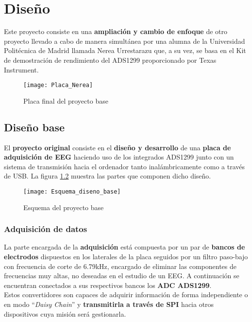 \chapter{Diseño\label{sec:Diseno}}

Este proyecto consiste en una \textbf{ampliación y cambio de enfoque} de otro proyecto llevado a cabo de manera simultánea por una alumna de la Universidad Politécnica de Madrid llamada Nerea Urrestarazu que, a su vez, se basa en el Kit de demostración de rendimiento del ADS1299 proporcionado por Texas Instrument.

\begin{figure} [h]
    \centering
    \texttt{[image: Placa\_Nerea]}
    \caption{Placa final del proyecto base}
    \label{fig:Placa_base}
\end{figure}

\section{Diseño base\label{sec:Diseno_base_N}}

El \textbf{proyecto original} consiste en el \textbf{diseño y desarrollo} de una \textbf{placa de adquisición de \acrshort{EEG}} haciendo uso de los integrados ADS1299 junto con un sistema de transmisión hacia el ordenador tanto inalámbricamente como a través de USB. La figura \ref{fig:Diseno_base} muestra las partes que componen dicho diseño.

\begin{figure} [h]
    \centering
    \texttt{[image: Esquema\_diseno\_base]}
    \caption{Esquema del proyecto base}
    \label{fig:Diseno_base}
\end{figure}

\subsection{Adquisición de datos\label{sec:Adquisicion_N}}

La parte encargada de la \textbf{adquisición} está compuesta por un par de \textbf{bancos de electrodos} dispuestos en los laterales de la placa seguidos por un filtro paso-bajo con frecuencia de corte de 6.79kHz, encargado de eliminar las componentes de frecuencias muy altas, no deseadas en el estudio de un \acrshort{EEG}. A continuación se encuentran conectados a sus respectivos bancos los \textbf{\acrshort{ADC} ADS1299}. 
\\Estos convertidores son capaces de adquirir información de forma independiente o en modo ``\textit{Daisy Chain}'' y \textbf{transmitirla a través de \acrshort{SPI}} hacia otros dispositivos cuya misión será gestionarla.

